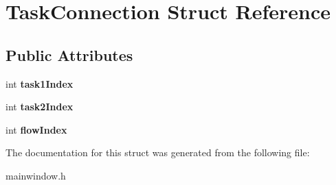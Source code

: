 \hypertarget{struct_task_connection}{}\section{Task\+Connection Struct Reference}
\label{struct_task_connection}
\subsection*{Public Attributes}
\begin{DoxyCompactItemize}
\item 
\hypertarget{struct_task_connection_afc60ae2ba6deaef4bf161d0e1bd397bf}{}int {\bfseries task1\+Index}\label{struct_task_connection_afc60ae2ba6deaef4bf161d0e1bd397bf}

\item 
\hypertarget{struct_task_connection_a82fc9fa059cc07bddc940fe26e37c1a5}{}int {\bfseries task2\+Index}\label{struct_task_connection_a82fc9fa059cc07bddc940fe26e37c1a5}

\item 
\hypertarget{struct_task_connection_a6d814febafe8d0773fa07c35811f0340}{}int {\bfseries flow\+Index}\label{struct_task_connection_a6d814febafe8d0773fa07c35811f0340}

\end{DoxyCompactItemize}


The documentation for this struct was generated from the following file\+:\begin{DoxyCompactItemize}
\item 
mainwindow.\+h\end{DoxyCompactItemize}
